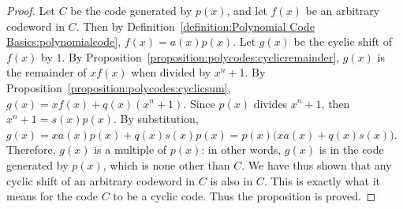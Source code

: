 \begin{proof}{}
Let $C$ be the code generated by $p(x)$, and let $f(x)$ be an arbitrary codeword in $C$.  Then by Definition~\ref{definition:Polynomial Code Basics:polynomialcode}, $f(x)= a(x)p(x)$.  Let $g(x)$ be the cyclic shift of $f(x)$ by $1$. By Proposition~\ref{proposition:polycodes:cyclicremainder}, $g(x)$ is the remainder of  $xf(x)$  when divided by $x^n+1$.  By Proposition~\ref{proposition:polycodes:cyclicsum},  $g(x)=xf(x) +  q(x)(x^n + 1)$. Since $p(x)$ divides $x^n+1$, then $x^n+1=s(x)p(x)$.  By substitution, $g(x)=xa(x)p(x) +  q(x)s(x)p(x)=p(x)\bigg(xa(x)+  q(x)s(x)\bigg)$. Therefore, $g(x)$ is a multiple of $p(x)$: in other words, $g(x)$ is in the code generated by $p(x)$, which is none other than $C$. We have thus shown that any cyclic shift of an arbitrary codeword in $C$ is also in $C$. This is exactly what it means for the code $C$ to be a cyclic code. Thus the proposition is proved.
\end{proof}








